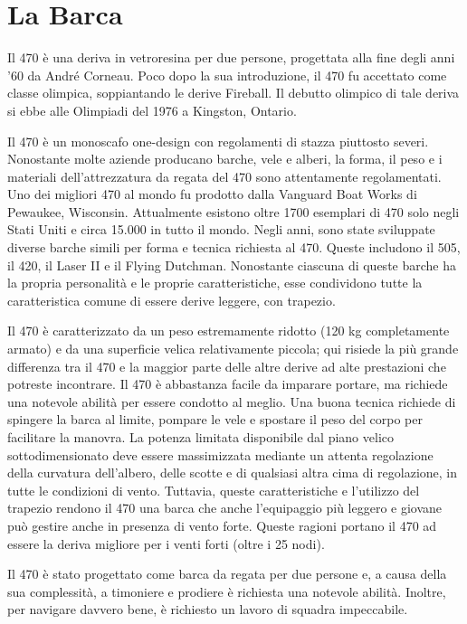
\chapter{La Barca}
\label{ch:LaBarca}
Il 470 è una deriva in vetroresina per due persone, progettata alla fine degli
anni '60 da André Corneau. Poco dopo la sua introduzione, il 470 fu accettato
come classe olimpica, soppiantando le derive Fireball. Il
debutto olimpico di tale deriva si ebbe alle Olimpiadi del 1976 a Kingston,
Ontario.

Il 470 è un monoscafo one-design con regolamenti di stazza piuttosto severi.
Nonostante molte aziende producano barche, vele e alberi, la forma, il peso e i
materiali dell'attrezzatura da regata del 470 sono attentamente regolamentati.
Uno dei migliori 470 al mondo fu prodotto dalla Vanguard Boat Works di Pewaukee,
Wisconsin. Attualmente esistono oltre 1700 esemplari di 470 solo negli Stati
Uniti e circa 15.000 in tutto il mondo. Negli anni, sono state sviluppate
diverse barche simili per forma e tecnica richiesta al 470. Queste includono il
505, il 420, il Laser II e il Flying Dutchman. Nonostante ciascuna di queste
barche ha la propria personalità e le proprie caratteristiche, esse condividono
tutte la caratteristica comune di essere derive leggere, con trapezio.

Il 470 è caratterizzato da un peso estremamente ridotto (120 kg completamente armato) e da una superficie velica
relativamente piccola; qui risiede la più grande differenza tra il 470 e la
maggior parte delle altre derive ad alte prestazioni che potreste incontrare. Il
470 è abbastanza facile da imparare portare, ma richiede una notevole
abilità per essere condotto al meglio. Una buona tecnica richiede di spingere la
barca al limite, pompare le vele e spostare il peso del corpo per facilitare la manovra.
La potenza limitata disponibile dal piano velico sottodimensionato deve essere
massimizzata mediante un attenta regolazione della curvatura dell'albero,
delle scotte e di qualsiasi altra cima di regolazione, in tutte le condizioni di
vento. Tuttavia, queste caratteristiche e l'utilizzo del trapezio rendono il 470
una barca che anche l'equipaggio più leggero e giovane può gestire anche in
presenza di vento forte. Queste ragioni portano il 470 ad essere la deriva migliore per i venti
forti (oltre i 25 nodi).

Il 470 è stato progettato come barca da regata per due persone e, a causa della
sua complessità, a timoniere e prodiere è richiesta una notevole
abilità. Inoltre, per navigare davvero bene, è richiesto un lavoro di squadra
impeccabile.

